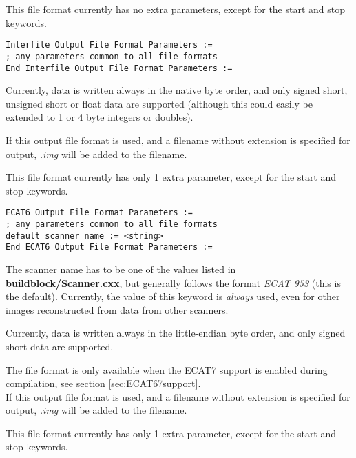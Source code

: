 \documentclass{article}
\begin{document}
{ 
}

This file format currently has no extra parameters, except for 
the start and stop keywords.

\begin{verbatim}
Interfile Output File Format Parameters :=
; any parameters common to all file formats
End Interfile Output File Format Parameters :=
\end{verbatim}

Currently, data is written always in the native byte order, and 
only signed short, unsigned short or float data are supported 
(although this could easily be extended to 1 or 4 byte integers 
or doubles).

{ 
}

If this output file format is used, and a filename without extension 
is specified for output, \textit{.img} will be added to the filename.

{ 
}

This file format currently has only 1 extra parameter, except 
for the start and stop keywords.

\begin{verbatim}
ECAT6 Output File Format Parameters :=
; any parameters common to all file formats
default scanner name := <string>
End ECAT6 Output File Format Parameters :=
\end{verbatim}

The scanner name has to be one of the values listed in \textbf{buildblock/Scanner.cxx}, 
but generally follows the format \textit{ECAT 953} (this is the default). 
Currently, the value of this keyword is \textit{always} used, even 
for other images reconstructed from data from other scanners.

Currently, data is written always in the little-endian byte order, 
and only signed short data are supported.

{ 
}

The file format is only available when the ECAT7 support is enabled 
during compilation, see section \ref{sec:ECAT67support}.\\
If this output file format is used, and a filename without extension 
is specified for output, \textit{.img} will be added to the filename.

{ 
}

This file format currently has only 1 extra parameter, except 
for the start and stop keywords.
\end{document}
